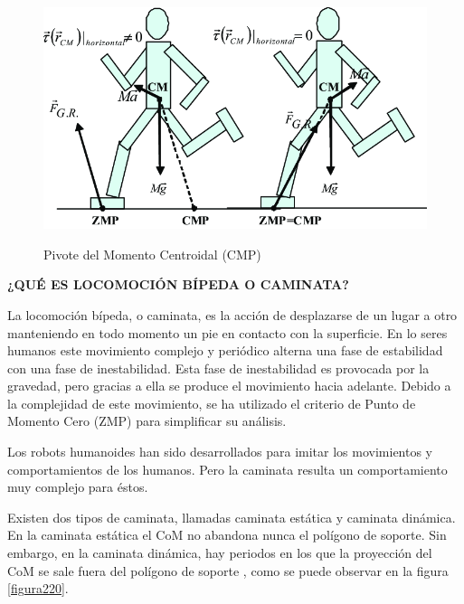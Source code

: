 \begin{itemize}

\begin{figure}[H]
\centering
{\includegraphics[scale=0.4]{imagenes/apartado_2/219_centroidal_moment_pivot}}
\caption{Pivote del Momento Centroidal (CMP)}
\label{figura219}
\end{figure}

\end{itemize}

\textbf{¿QUÉ ES LOCOMOCIÓN BÍPEDA O CAMINATA?}

La locomoción bípeda, o caminata, es la acción de desplazarse de un lugar a otro manteniendo en todo momento un pie en contacto con la superficie. En lo seres humanos este movimiento complejo y periódico alterna una fase de estabilidad con una fase de inestabilidad. Esta fase de inestabilidad es provocada por la gravedad, pero gracias a ella se produce el movimiento hacia adelante. Debido a la complejidad de este movimiento, se ha utilizado el criterio de Punto de Momento Cero (ZMP) para simplificar su análisis. 

Los robots humanoides han sido desarrollados para imitar los movimientos y comportamientos de los humanos. Pero la caminata resulta un comportamiento muy complejo para éstos. 

Existen dos tipos de caminata, llamadas caminata estática y  caminata dinámica. En la caminata estática el CoM no abandona nunca el polígono de soporte. Sin embargo, en la caminata dinámica, hay periodos en los que la proyección del CoM se sale fuera del polígono de soporte \cite{ref10}, como se puede observar en la figura \ref{figura220}.

